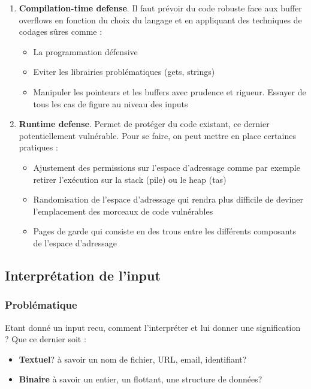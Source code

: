 \documentclass{report}
\begin{document}
\begin{enumerate}
    \item \textbf{Compilation-time defense}. Il faut prévoir du code robuste face aux buffer overflows en fonction du choix du langage et en appliquant des techniques de codages sûres comme :
    \begin{itemize}
        \item La programmation défensive
        \item Eviter les librairies problématiques (gets, strings)
        \item Manipuler les pointeurs et les buffers avec prudence et rigueur. Essayer de tous les cas de figure au niveau des inputs
    \end{itemize}

    \item \textbf{Runtime defense}. Permet de protéger du code existant, ce dernier potentiellement vulnérable. Pour se faire, on peut mettre en place certaines pratiques :
    \begin{itemize}
        \item Ajustement des permissions sur l'espace d'adressage comme par exemple retirer l'exécution sur la stack (pile) ou le heap (tas)
        \item Randomisation de l'espace d'adressage qui rendra plus difficile de deviner l'emplacement des morceaux de code vulnérables
        \item Pages de garde qui consiste en des trous entre les différents composants de l'espace d'adressage
    \end{itemize}
\end{enumerate}

\subsection{Interprétation de l'input}

\subsubsection{Problématique}

Etant donné un input recu, comment l'interpréter et lui donner une signification ? Que ce dernier soit :
\begin{itemize}
    \item \textbf{Textuel}? à savoir un nom de fichier, URL, email, identifiant?
    \item \textbf{Binaire} à savoir un entier, un flottant, une structure de données?
\end{itemize}
\end{document}
